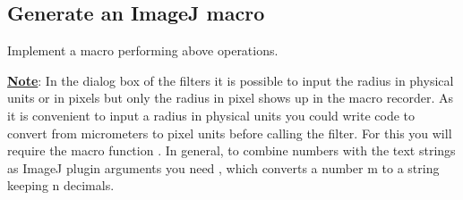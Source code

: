 \subsection{Generate an ImageJ macro}

Implement a macro performing above operations.

\underline{\textbf{Note}}: In the dialog box of the filters it is possible to input the radius in physical units or in pixels but only the radius in pixel shows up in the macro recorder. As it is convenient to input a radius in physical units you could write code to convert from micrometers to pixel units before calling the filter. For this you will require the macro function . In general, to combine numbers with the text strings as ImageJ plugin arguments you need , which converts a number m to a string keeping n decimals.


